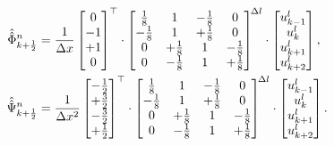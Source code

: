 \begin{align}
\hat{\hat{\Phi}}_{k+\frac12}^n
&= \frac{1}{\Delta x}
\begin{bmatrix}0 \\ -1 \\ +1 \\ 0\end{bmatrix}^\top \cdot
\begin{bmatrix}
\frac{1}{8} & 1 & -\frac{1}{8} & 0\\
-\frac{1}{8} & 1 & +\frac{1}{8} & 0\\
0 & +\frac{1}{8} & 1 & -\frac{1}{8}\\
0 & -\frac{1}{8} & 1 & +\frac{1}{8}
\end{bmatrix}^{\!\Delta l} \cdot
\begin{bmatrix}
u^l_{k-1}\\ u^l_{k}\\ u^l_{k+1}\\ u^l_{k+2}
\end{bmatrix},\\
\hat{\hat{\Psi}}_{k+\frac12}^n
&= \frac{1}{\Delta x^2}
\begin{bmatrix}-\tfrac12 \\ +\tfrac32 \\ -\tfrac32 \\ +\tfrac12\end{bmatrix}^\top \cdot
\begin{bmatrix}
\frac{1}{8} & 1 & -\frac{1}{8} & 0\\
-\frac{1}{8} & 1 & +\frac{1}{8} & 0\\
0 & +\frac{1}{8} & 1 & -\frac{1}{8}\\
0 & -\frac{1}{8} & 1 & +\frac{1}{8}
\end{bmatrix}^{\!\Delta l} \cdot
\begin{bmatrix}
u^l_{k-1}\\ u^l_{k}\\ u^l_{k+1}\\ u^l_{k+2}
\end{bmatrix}.
\end{align}


